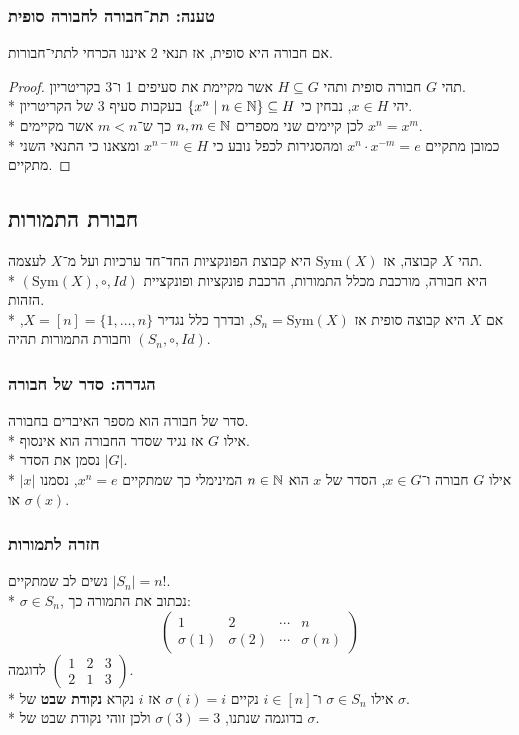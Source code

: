 \subsubsection{טענה: תת־חבורה לחבורה סופית}
אם חבורה היא סופית, אז תנאי 2 איננו הכרחי לתתי־חבורות.
\begin{proof}
	תהי $G$ חבורה סופית ותהי $H \subseteq G$ אשר מקיימת את סעיפים 1 ו־3 בקריטריון. \\*
	יהי $x \in H$, נבחין כי $\{ x^n \mid n \in \mathbb{N} \} \subseteq H$ בעקבות סעיף 3 של הקריטריון. \\*
	לכן קיימים שני מספרים $n, m \in \mathbb{N}$ כך ש־$m < n$ אשר מקיימים $x^n = x^m$. \\*
	כמובן מתקיים $x^n \cdot x^{-m} = e$ ומהסגירות לכפל נובע כי $x^{n - m} \in H$ ומצאנו כי התנאי השני מתקיים.
\end{proof}

\subsection{חבורת התמורות}
תהי $X$ קבוצה, אז $\text{Sym}(X)$ היא קבוצת הפונקציות החד־חד ערכיות ועל מ־$X$ לעצמה. \\*
$(\text{Sym}(X), \circ, Id)$ היא חבורה, מורכבת מכלל התמורות, הרכבת פונקציות ופונקציית הזהות. \\*
אם $X$ היא קבוצה סופית אז $S_n = \text{Sym}(X)$, ובדרך כלל נגדיר $X = [n] = \{1, \hdots, n\}$, וחבורת התמורות תהיה $(S_n, \circ, Id)$.

\subsubsection{הגדרה: סדר של חבורה}
סדר של חבורה הוא מספר האיברים בחבורה. \\*
אילו $G$ אז נגיד שסדר החבורה הוא אינסוף. \\*
נסמן את הסדר $|G|$. \\*
אילו $G$ חבורה ו־$x \in G$, הסדר של $x$ הוא $n \in \mathbb{N}$ המינימלי כך שמתקיים $x^n = e$, נסמנו $|x|$ או $\sigma(x)$.

\subsubsection{חזרה לתמורות}
נשים לב שמתקיים $|S_n| = n !$. \\* %
$\sigma \in S_n$, נכתוב את התמורה כך:
\[
	\begin{pmatrix}
		1 & 2 & \cdots & n \\
		\sigma(1) & \sigma(2) & \cdots & \sigma(n)
	\end{pmatrix}
\]
לדוגמה $\begin{pmatrix}
	1 & 2 & 3 \\
	2 & 1 & 3
\end{pmatrix}$. \\*
אילו $\sigma \in S_n$ ו־$i \in [n]$ נקיים $\sigma(i) = i$ אז $i$ נקרא \textbf{נקודת שבט} של $\sigma$. \\*
בדוגמה שנתנו, $\sigma(3) = 3$ ולכן זוהי נקודת שבט של $\sigma$.

